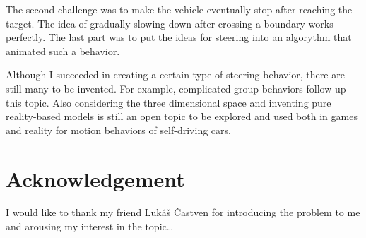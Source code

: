 \documentclass[10pt,twoside,english,a4paper]{article}
\begin{document}
The second challenge was to make the vehicle eventually stop after 
reaching the target. The idea of gradually slowing down after 
crossing a boundary works perfectly. The last part was to put the ideas
for steering into an algorythm that animated such a behavior. 

Although I succeeded in creating a certain type of steering behavior,
there are still many to be invented. For example, complicated group behaviors
follow-up this topic. Also considering the three dimensional space
and inventing pure reality-based models is still an open topic to be explored
and used both in games and reality for motion behaviors of 
self-driving cars.

\section*{Acknowledgement}
I would like to thank my friend Lukáš Častven for introducing 
the problem to me and arousing my interest in the topic\ldots


 
\end{document}
